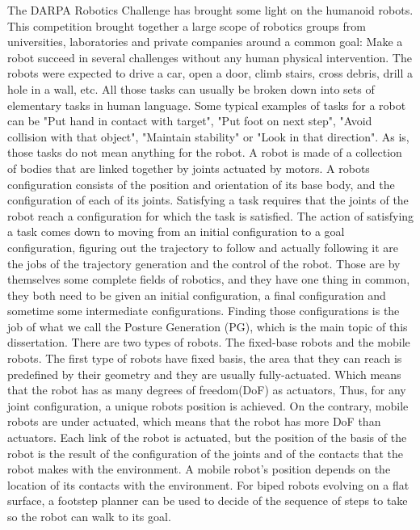 The DARPA Robotics Challenge has brought some light on the humanoid robots.
This competition brought together a large scope of robotics groups from universities, laboratories and private companies around a common goal: Make a robot succeed in several challenges without any human physical intervention.
The robots were expected to drive a car, open a door, climb stairs, cross debris, drill a hole in a wall, etc.
All those tasks can usually be broken down into sets of elementary tasks in human language.
Some typical examples of tasks for a robot can be "Put hand in contact with target", "Put foot on next step", "Avoid collision with that object", "Maintain stability" or "Look in that direction".
As is, those tasks do not mean anything for the robot.
A robot is made of a collection of bodies that are linked together by joints actuated by motors.
A robots configuration consists of the position and orientation of its base body, and the configuration of each of its joints.
Satisfying a task requires that the joints of the robot reach a configuration for which the task is satisfied.
The action of satisfying a task comes down to moving from an initial configuration to a goal configuration, figuring out the trajectory to follow and actually following it are the jobs of the trajectory generation and the control of the robot.
Those are by themselves some complete fields of robotics, and they have one thing in common, they both need to be given an initial configuration, a final configuration and sometime some intermediate configurations.
Finding those configurations is the job of what we call the Posture Generation (PG), which is the main topic of this dissertation.
There are two types of robots. The fixed-base robots and the mobile robots.
The first type of robots have fixed basis, the area that they can reach is predefined by their geometry and they are usually fully-actuated.
Which means that the robot has as many degrees of freedom(DoF) as actuators, Thus, for any joint configuration, a unique robots position is achieved.
On the contrary, mobile robots are under actuated, which means that the robot has more DoF than actuators.
Each link of the robot is actuated, but the position of the basis of the robot is the result of the configuration of the joints and of the contacts that the robot makes with the environment.
A mobile robot's position depends on the location of its contacts with the environment.
For biped robots evolving on a flat surface, a footstep planner can be used to decide of the sequence of steps to take so the robot can walk to its goal.

